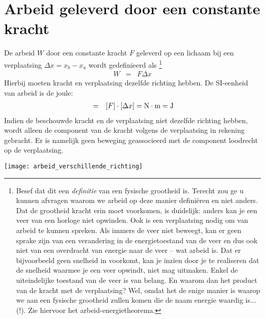 \documentclass{ximera}
\begin{document}
	
	\section{Arbeid geleverd door een constante kracht}
	
	De arbeid $W$ door een constante kracht $F$ geleverd op een lichaam bij een verplaatsing $\Delta x=x_b-x_a$ wordt gedefinieerd als \footnote{Besef dat dit een \textit{definitie} van een fysische grootheid is. Terecht zou ge u kunnen afvragen waarom we arbeid op deze manier defini\"eren en niet anders. Dat de grootheid kracht erin moet voorkomen, is duidelijk: anders kan je een veer van een horloge niet opwinden. Ook is een verplaatsing nodig om van arbeid te kunnen spreken. Als immers de veer niet beweegt, kan er geen sprake zijn van een verandering in de energietoestand van de veer en dus ook niet van een overdracht van energie naar de veer -- wat arbeid is. Dat er bijvoorbeeld geen snelheid in voorkomt, kan je inzien door je te realiseren dat de snelheid waarmee je een veer opwindt, niet mag uitmaken. Enkel de uiteindelijke toestand van de veer is van belang. En waarom dan het product van de kracht met de verplaatsing? Wel, omdat het de enige manier is waarop we aan een fysische grootheid zullen komen die de naam energie waardig is... (!). Zie hiervoor het arbeid-energietheorema.}
	\begin{eqnarray}
	W&=&F\Delta x
	\end{eqnarray}
	Hierbij moeten kracht en verplaatsing dezelfde richting hebben. De SI-eenheid van arbeid is de joule:
	\begin{eqnarray*}
	[W]&=&[F]\cdot[\Delta x]=\rm N\cdot m=J
	\end{eqnarray*}
	Indien de beschouwde kracht en de verplaatsing niet dezelfde richting hebben, wordt alleen de component van de kracht volgens de verplaatsing in rekening gebracht. Er is namelijk geen beweging geassocieerd met de component loodrecht op de verplaatsing.
	\begin{image}
	\texttt{[image: arbeid\_verschillende\_richting]}
	\end{image}
	
\end{document}
